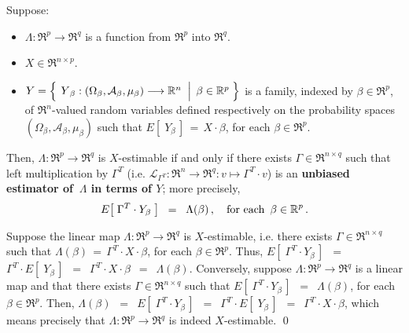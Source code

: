 \begin{proposition}
\mbox{}\vskip 0.1cm\noindent
Suppose:
\begin{itemize}
\item
	$\Lambda : \Re^{p} \longrightarrow \Re^{q}$ is a function from $\Re^{p}$ into $\Re^{q}$.
\item
	$X \in \Re^{n \times p}$.
\item
	$Y = \left\{\;
		\left.
		\overset{{\color{white}.}}{Y}_{\beta} : (\Omega_{\beta},\mathcal{A}_{\beta},\mu_{\beta}) \longrightarrow \Re^{n}
		\;\;\right\vert\;
		\beta \in \Re^{p}
		\;\right\}$
	is a family, indexed by $\beta \in \Re^{p}$,
	of $\Re^{n}$-valued random variables defined respectively on the 
	probability spaces $(\Omega_{\beta},\mathcal{A}_{\beta},\mu_{\beta})$ 
	{\color{red}such that $E\!\left[\;Y_{\beta}\,\right] \,=\, X \cdot \beta$, for each $\beta \in \Re^{p}$}.
\end{itemize}
Then, $\Lambda : \Re^{p} \longrightarrow \Re^{q}$ is $X$-estimable
if and only if there exists $\Gamma \in \Re^{n \times q}$ such that
left multiplication by $\Gamma^{T}$
(i.e. $\mathcal{L}_{\Gamma^{T}} : \Re^{n} \longrightarrow \Re^{q} : v \longmapsto \Gamma^{T} \cdot v$)
is an \textbf{unbiased estimator of \,$\Lambda$ in terms of $Y$}; more precisely,
\begin{equation*}
E\!\left[\;\Gamma^{T} \cdot Y_{\beta}\;\right] \;\; = \;\; \Lambda(\beta)\,,
\quad
\textnormal{for each \,$\beta \in \Re^{p}$}\,.
\end{equation*}
\end{proposition}
\proof
Suppose the linear map $\Lambda : \Re^{p} \longrightarrow \Re^{q}$
is $X$-estimable, i.e. there exists $\Gamma \in \Re^{n \times q}$ such that
$\Lambda(\beta) \,=\, \Gamma^{T} \cdot X \cdot \beta$, for each $\beta \in \Re^{p}$.
Thus,
$E\!\left[\;\Gamma^{T} \cdot Y_{\beta}\,\right]$
\,$=$\, $\Gamma^{T} \cdot E\!\left[\;Y_{\beta}\,\right]$
\,$=$\, $\Gamma^{T} \cdot X \cdot \beta$
\,$=$\, $\Lambda(\beta)$.
Conversely, suppose $\Lambda : \Re^{p} \longrightarrow \Re^{q}$ is a linear map
and that there exists $\Gamma \in \Re^{n \times q}$
such that $E\!\left[\;\Gamma^{T} \cdot Y_{\beta}\,\right]$ \,$=$\, $\Lambda(\beta)$,
for each $\beta \in \Re^{p}$.
Then,
$\Lambda(\beta)$
\,$=$\, $E\!\left[\;\Gamma^{T} \cdot Y_{\beta}\,\right]$
\,$=$\, $\Gamma^{T} \cdot E\!\left[\;Y_{\beta}\,\right]$
\,$=$\, $\Gamma^{T} \cdot X \cdot \beta$,
which means precisely that $\Lambda : \Re^{p} \longrightarrow \Re^{q}$ is indeed $X$-estimable.
\qed


